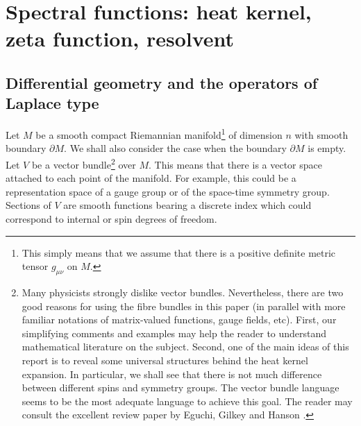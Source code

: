 \section{Spectral functions: heat kernel, zeta function, resolvent}
\label{sec2}
\subsection{Differential geometry and the operators of Laplace type}
\label{s2geo} 
Let $M$ be a smooth compact Riemannian manifold\footnote{This simply
means that we assume that there is a positive definite metric
tensor $g_{\mu\nu}$ on $M$.}
of dimension $n$ with smooth boundary $\partial M$.
We shall also consider the case when the boundary
$\partial M$ is empty. Let $V$ be a vector 
bundle\footnote{Many physicists strongly dislike vector bundles.
Nevertheless, there are two good reasons for using the fibre
bundles in this paper (in parallel with more familiar notations of matrix-valued
functions, gauge fields, etc). 
First, our simplifying comments and
examples may help the reader to understand mathematical
literature on the subject. Second, one of the main ideas of this
report is to reveal some universal structures behind the heat
kernel expansion. In particular, we shall see that there is not
much difference between different spins and symmetry groups.
The vector bundle language seems to be the most adequate language
to achieve this goal. The reader may consult the excellent review paper 
by Eguchi, Gilkey and Hanson \cite{Eguchi:1980jx}.
} over $M$. This means that there is a vector space
attached to each point of the manifold. For example, this
could be a representation space of a gauge group or of the
space-time symmetry group.
Sections of $V$ are smooth functions bearing
a discrete index which could correspond to internal
or spin degrees of freedom. 

